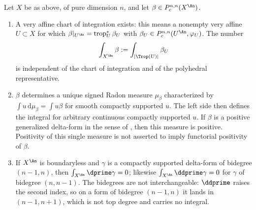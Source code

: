 \begin{proposition}
\label{prop:ch18-delta-integration}
Let $X$ be as above, of pure dimension $n$, and let $\beta\in P^{n,n}_c(X^{\An})$.
\begin{enumerate}
\item\label{itm:ch18-di:defined}
 A very affine chart of integration exists: this means a nonempty very
 affine $U\subset X$ for which
 $\beta|_{U^{\An}}=\operatorname{trop}_U^*\beta_U$ with
 $\beta_U\in P_c^{n,n}(U^{\An},\varphi_U)$.  The number
 \[
       \int_{X^{\An}}\beta:=\int_{|\Trop(U)|}\beta_U
 \]
 is independent of the chart of integration and of the polyhedral
 representative.
\item\label{itm:ch18-di:measure}
 $\beta$ determines a unique signed Radon measure $\mu_\beta$ characterized
 by
 $\int u\,\mathrm d\mu_\beta=\int u\beta$ for smooth compactly supported
 $u$.  The left side then defines the integral for arbitrary continuous
 compactly supported $u$.  If $\beta$
 is a positive generalized delta-form in the sense of
 , then this measure is positive.  Positivity of
 this single measure is not asserted to imply functorial positivity of
 $\beta$.
\item\label{itm:ch18-di:stokes}
 If $X^{\An}$ is boundaryless and $\gamma$ is a compactly supported
 delta-form of bidegree $(n-1,n)$, then
 $\int_{X^{\An}}\dprime\gamma=0$; likewise
 $\int_{X^{\An}}\ddprime\gamma=0$ for $\gamma$ of bidegree $(n,n-1)$.  The
 bidegrees are not interchangeable: $\ddprime$ raises the second index, so
 on a form of bidegree $(n-1,n)$ it lands in $(n-1,n+1)$, which is not top
 degree and carries no integral.
\end{enumerate}
\end{proposition}

